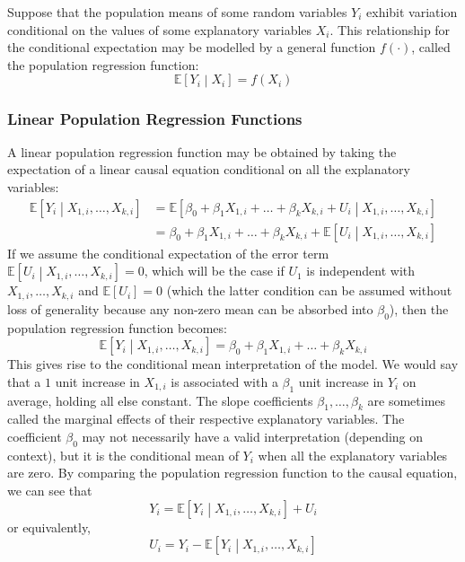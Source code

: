 \documentclass[11pt]{report} %
\begin{document}
Suppose that the population means of some random variables $Y_{i}$ exhibit variation conditional on the values of some explanatory variables $X_{i}$. This relationship for the conditional expectation may be modelled by a general function $f\left(\cdot\right)$, called the population regression function:
\begin{equation}
\mathbb{E}\left[Y_{i}\middle|X_{i}\right] = f\left(X_{i}\right)
\end{equation}

\subsubsection{Linear Population Regression Functions}

A linear population regression function may be obtained by taking the expectation of a linear causal equation conditional on all the explanatory variables:
\begin{align}
\mathbb{E}\left[Y_{i}\middle|X_{1, i}, \dots, X_{k, i}\right] &= \mathbb{E}\left[\beta_{0} + \beta_{1}X_{1, i} + \dots + \beta_{k}X_{k, i} + U_{i}\middle|X_{1, i}, \dots, X_{k, i}\right] \\
&= \beta_{0} + \beta_{1}X_{1, i} + \dots + \beta_{k}X_{k, i} + \mathbb{E}\left[U_{i}\middle|X_{1, i}, \dots, X_{k, i}\right]
\end{align}
If we assume the conditional expectation of the error term $\mathbb{E}\left[U_{i}\middle|X_{1, i}, \dots, X_{k, i}\right] = 0$, which will be the case if $U_{1}$ is independent with $X_{1, i}, \dots, X_{k, i}$ and $\mathbb{E}\left[U_{i}\right] = 0$ (which the latter condition can be assumed without loss of generality because any non-zero mean can be absorbed into $\beta_{0}$), then the population regression function becomes:
\begin{equation}
\mathbb{E}\left[Y_{i}\middle|X_{1, i}, \dots, X_{k, i}\right] = \beta_{0} + \beta_{1}X_{1, i} + \dots + \beta_{k}X_{k, i}
\end{equation}
This gives rise to the conditional mean interpretation of the model. We would say that a $1$ unit increase in $X_{1, i}$ is associated with a $\beta_{1}$ unit increase in $Y_{i}$ on average, holding all else constant. The slope coefficients $\beta_{1}, \dots, \beta_{k}$ are sometimes called the marginal effects of their respective explanatory variables. The coefficient $\beta_{0}$ may not necessarily have a valid interpretation (depending on context), but it is the conditional mean of $Y_{i}$ when all the explanatory variables are zero. By comparing the population regression function to the causal equation, we can see that
\begin{equation}
Y_{i} = \mathbb{E}\left[Y_{i}\middle|X_{1, i}, \dots, X_{k, i}\right] + U_{i}
\end{equation}
or equivalently,
\begin{equation}
U_{i} = Y_{i} - \mathbb{E}\left[Y_{i}\middle|X_{1, i}, \dots, X_{k, i}\right]
\end{equation}
\end{document}
